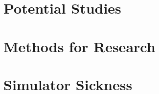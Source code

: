 \documentclass{article}
\begin{document}
\section{Potential Studies}




\section*{Methods for Research}



\section{Simulator Sickness}



{}
\end{document}
